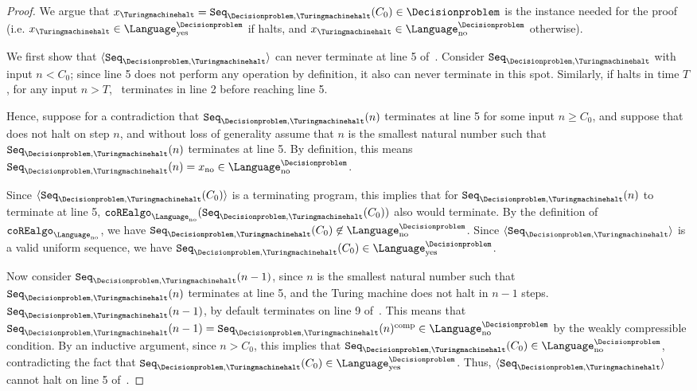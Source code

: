 \begin{proof}
	We argue that $x_{\text{\Turingmachinehalt}} = \UniformseqREproof(C_0) \in \Decisionproblem$ is the instance needed for the proof (i.e. $x_{\text{\Turingmachinehalt}} \in \Language_{\text{yes}}^\Decisionproblem$ if \Turingmachinehalt halts, and  $x_{\text{\Turingmachinehalt}} \in \Language_{\text{no}}^\Decisionproblem$ otherwise). 
	
	We first show that $\langle \UniformseqREproof \rangle$ can never terminate at line 5 of~. Consider $\UniformseqREproof$ with input $n < C_0$; since line 5 does not perform any operation by definition, it also can never terminate in this spot. Similarly, if \Turingmachinehalt halts in time $T$, for any input $n > T$,~ terminates in line 2 before reaching line 5.  
	
	
	Hence, suppose for a contradiction that $\UniformseqREproof(n)$ terminates at line 5 for some input $n \geq C_0$, and suppose that \Turingmachinehalt does not halt on step $n$, and without loss of generality assume that $n$ is the smallest natural number such that $\UniformseqREproof(n)$ terminates at line 5. By definition, this means $\UniformseqREproof(n) = x_{\text{no}} \in \Language_{\text{no}}^\Decisionproblem$.
	
	Since $\langle \texttt{Seq}_{\Decisionproblem,\text{\Turingmachinehalt}}(C_0) \rangle$ is a terminating program, this implies that for $\UniformseqREproof(n)$ to terminate at line 5, $\coREalgoproof(\texttt{Seq}_{\Decisionproblem,\text{\Turingmachinehalt}}(C_0))$ also would terminate. By the definition of $\coREalgoproof$, we have $\texttt{Seq}_{\Decisionproblem,\text{\Turingmachinehalt}}(C_0) \not\in \Language_{\text{no}}^\Decisionproblem$. Since $\langle \UniformseqREproof \rangle$ is a valid uniform sequence, we have $\texttt{Seq}_{\Decisionproblem,\text{\Turingmachinehalt}}(C_0) \in \Language_{\text{yes}}^\Decisionproblem$.
	
	Now consider $\UniformseqREproof(n-1)$, since $n$ is the smallest natural number such that $\UniformseqREproof(n)$ terminates at line 5, and the Turing machine \Turingmachinehalt does not halt in $n-1$ steps. $\UniformseqREproof(n-1)$, by default terminates on line 9 of~. This means that $\UniformseqREproof(n-1) = \UniformseqREproof(n)^{\text{comp}} \in  \Language_{\text{no}}^\Decisionproblem$ by the weakly compressible condition. By an inductive argument, since $n > C_0$, this implies that $\UniformseqREproof(C_0) \in \Language_{\text{no}}^\Decisionproblem$, contradicting the fact that $\UniformseqREproof(C_0) \in \Language_{\text{yes}}^\Decisionproblem$. Thus, $\langle \UniformseqREproof \rangle$ cannot halt on line 5 of~.
	

\end{proof}
